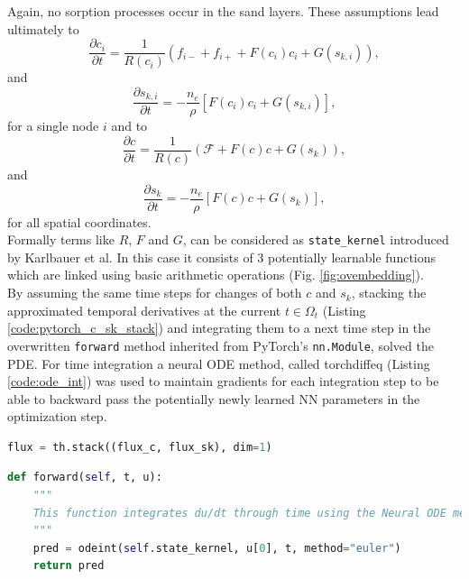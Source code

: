 Again, no sorption processes occur in the sand layers. These assumptions lead ultimately to
\begin{equation}
    \frac{\partial c_i}{\partial t} = \frac{1}{R(c_i)} \left(f_{i-}+f_{i+}+F(c_i)c_i+G(s_{k,i})\right),
\end{equation}
and
\begin{equation}
   \frac{\partial s_{k,i}}{\partial t} = -\frac{n_e}{\rho}\left[F(c_i)c_i+G(s_{k,i})\right],
\end{equation}
for a single node $i$ and to
\begin{equation}
    \frac{\partial c}{\partial t} = \frac{1}{R(c)} \left(\mathcal{F}+F(c)c+G(s_k)\right),
\end{equation}
and
\begin{equation}
   \frac{\partial s_{k}}{\partial t} = -\frac{n_e}{\rho}\left[F(c)c+G(s_k)\right],
\end{equation}
for all spatial coordinates.\\
Formally terms like $R$, $F$ and $G$, can be considered as \texttt{state\_kernel} introduced by Karlbauer et al. In this case it consists of 3 potentially learnable functions which are linked using basic arithmetic operations (Fig. \ref{fig:ovembedding}).\\
By assuming the same time steps for changes of both $c$ and $s_k$, stacking the approximated temporal derivatives at the current $t\in \Omega_t$ (Listing \ref{code:pytorch_c_sk_stack}) and integrating them to a next time step in the overwritten \texttt{forward} method inherited from PyTorch's \texttt{nn.Module}, solved the PDE. For time integration a neural ODE method, called torchdiffeq \cite{torchdiffeq} (Listing \ref{code:ode_int}) was used to maintain gradients for each integration step to be able to backward pass the potentially newly learned NN parameters in the optimization step.
\begin{lstlisting}[float, language=python, caption={Stacking of calculated $c$ and $s_k$ fluxes.}, label=code:pytorch_c_sk_stack]
flux = th.stack((flux_c, flux_sk), dim=1)
\end{lstlisting}
\begin{lstlisting}[float, language=python, caption={Time integration with neural ODE.}, label=code:ode_int]
def forward(self, t, u):
    """
    This function integrates du/dt through time using the Neural ODE method
    """
    pred = odeint(self.state_kernel, u[0], t, method="euler")
    return pred
\end{lstlisting}
